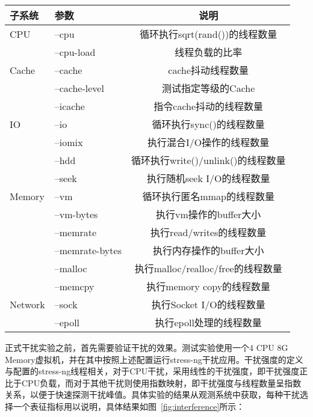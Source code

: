 \begin{table}[H]
    \centering
    \footnotesize%
    \setlength{\tabcolsep}{20pt}%
    \renewcommand{\arraystretch}{1.25}%
    \label{tab:arg_list}
    \begin{tabular}{llc}
        \hline
        子系统 & 参数 & 说明\\
        \hline
        CPU	    & --cpu & 循环执行sqrt(rand())的线程数量\\
	            & --cpu-load & 线程负载的比率\\
        Cache	& --cache & cache抖动线程数量\\
	            & --cache-level	&测试指定等级的Cache\\
	            & --icache	&指令cache抖动的线程数量\\
        IO	    & --io	&循环执行sync()的线程数量\\
	            & --iomix	&执行混合I/O操作的线程数量\\
	            & --hdd	&循环执行write()/unlink()的线程数量\\
	            & --seek	&执行随机seek I/O的线程数量\\
        Memory	& --vm	&循环执行匿名mmap的线程数量\\
	            & --vm-bytes	&执行vm操作的buffer大小\\
	            & --memrate	&执行read/writes的线程数量\\
	            & --memrate-bytes	&执行内存操作的buffer大小\\
	            & --malloc	&执行malloc/realloc/free的线程数量\\
	            & --memcpy	&执行memory copy的线程数量\\
        Network	& --sock	&执行Socket I/O的线程数量\\
	            & --epoll	&执行epoll处理的线程数量\\
        \hline
    \end{tabular}
\end{table}

正式干扰实验之前，首先需要验证干扰的效果。测试实验使用一个4 CPU 8G Memory虚拟机，并在其中按照上述配置运行stress-ng干扰应用。干扰强度的定义与配置的stress-ng线程相关，对于CPU干扰，采用线性的干扰强度，即干扰强度正比于CPU负载，而对于其他干扰则使用指数映射，即干扰强度与线程数量呈指数关系，以便于快速探测干扰峰值。具体实验的结果从观测系统中获取，每种干扰选择一个表征指标用以说明，具体结果如图~\ref{fig:interference}所示：

